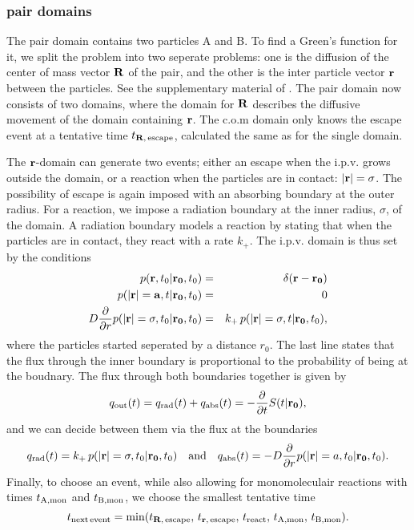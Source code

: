 \subsubsection{pair domains}
The pair domain contains two particles A and B. To find a Green's function for it, we split the problem into two seperate problems: one is the diffusion of the center of mass vector ${\bf R}$ of the pair, and the other is the inter particle vector ${\bf r}$ between the particles. See the supplementary material of \cite{Takahashi2010}. The pair domain now consists of two domains, where the domain for ${\bf R}$ describes the diffusive movement of the domain containing ${\bf r}$. The c.o.m domain only knows the escape event at a tentative time $t_{{\bf R},\,{\rm escape}}$, calculated the same as for the single domain. 

The ${\bf r}$-domain can generate two events; either an escape when the i.p.v. grows outside the domain, or a reaction when the particles are in contact: ${\bf |r|}=\sigma$. The possibility of escape is again imposed with an absorbing boundary at the outer radius. For a reaction, we impose a radiation boundary at the inner radius, $\sigma$, of the domain. A radiation boundary models a reaction by stating that when the particles are in contact, they react with a rate $k_+$. The i.p.v. domain is thus set by the conditions
\setlength{\jot}{10pt}
\begin{eqnarray}
 p({\bf r}, t_0|{\bf r_0},t_0) & = & \delta(\mathbf{r - r_0}) \\
 p({\bf |r|=a}, t|{\bf r_0},t_0) & = & 0 \\
 D \frac{\partial }{\partial r} p({\bf |r|}=\sigma, t_0|{\bf r_0},t_0) & = & k_+\,p({\bf |r|}=\sigma, t|{\bf r_0},t_0),
\end{eqnarray}
where the particles started seperated by a distance $r_0$. The last line states that the flux through the inner boundary is proportional to the probability of being at the boudnary. The flux through both boundaries together is given by
\begin{equation}
 q_{\rm out}(t) = q_{\rm rad}(t) + q_{\rm abs}(t) = -\frac{\partial }{\partial t} S(t|{\bf r_0}),
\end{equation}
and we can decide between them via the flux at the boundaries
\begin{equation}
q_{\rm rad}(t) = k_+ \, p({\bf |r|}=\sigma, t_0|{\bf r_0},t_0) \quad{\rm and}\quad q_{\rm abs}(t) = - D \frac{\partial }{\partial r} p({\bf |r|}=a, t_0|{\bf r_0},t_0).
\end{equation}
Finally, to choose an event, while also allowing for monomoleculair reactions with times $t_{\rm A, mon}$ and $t_{\rm B, mon}$, we choose the smallest tentative time
\begin{equation}
 t_{\rm next\,event} = {\rm min}(t_{{\bf R},\,{\rm escape}},\,t_{{\bf r},\,{\rm escape}},\,t_{\rm react},\,t_{\rm A, mon},\,t_{\rm B, mon}).
\end{equation}

